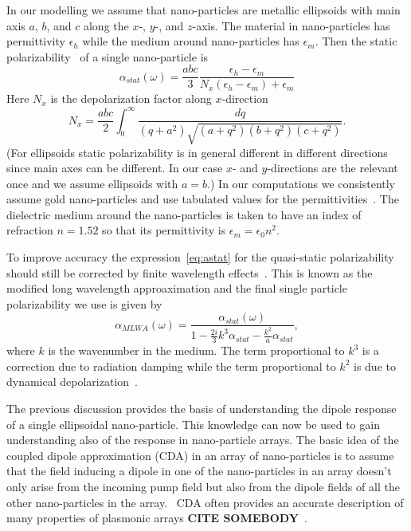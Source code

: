 \documentclass{iopart}
\newcommand{\beq}{\begin{equation}}
\newcommand{\enq}{\end{equation}}
\begin{document}
In our modelling we assume that nano-particles are metallic ellipsoids
with main axis $a$, $b$, and $c$ along the $x$-, $y$-, and $z$-axis.
The material in nano-particles has permittivity $\epsilon_h$ while
the medium around nano-particles has $\epsilon_m$. 
Then the static polarizability~\cite{meier_enhanced_1983} of a single nano-particle is
\beq
\alpha_{stat}(\omega)=\frac{abc}{3}\frac{\epsilon_h-\epsilon_m}{N_x(\epsilon_h-\epsilon_m)+\epsilon_m}
\label{eq:astat}
\enq
Here $N_x$ is the depolarization factor along $x$-direction
\beq
N_x=\frac{abc}{2}\int_0^\infty \frac{dq}{(q+a^2)\sqrt{(a+q^2)(b+q^2)(c+q^2)}}.
\enq
(For ellipsoids static polarizability is in general different in different directions since main axes can be different. In our case $x$- and $y$-directions are the relevant once and we assume ellipsoids with $a=b$.)
In our computations we consistently assume gold nano-particles
and use tabulated values for the permittivities~\cite{johnson_optical_1972}.
The dielectric medium around the nano-particles is taken to have an index of refraction 
$n=1.52$ so that its permittivity is $\epsilon_m=\epsilon_0 n^2$.

To improve accuracy the expression~\ref{eq:astat} for the quasi-static polarizability should still be corrected by finite wavelength effects~\cite{meier_enhanced_1983}. This is
known as the modified long wavelength approaximation and the final single
particle polarizability we use is given by
\beq
\alpha_{MLWA}(\omega)=\frac{\alpha_{stat}(\omega)}{1-\frac{2i}{3}k^3\alpha_{stat}-\frac{k^2}{a}\alpha_{stat}},
\enq
where $k$ is the wavenumber in the medium. The term proportional to
$k^3$ is a correction due to radiation damping while the term proportional to
$k^2$ is due to dynamical depolarization~\cite{kelly_optical_2003}.

The previous discussion provides the basis of understanding 
the dipole response of a single ellipsoidal nano-particle. This
knowledge can now be used to gain understanding also of the response in 
nano-particle arrays.
The basic idea of the coupled dipole approximation (CDA) 
in an array of nano-particles is to assume that the field inducing a dipole in one of the nano-particles
in an array doesn't only arise from the incoming pump field but also
from the dipole fields of all the other
nano-particles in the array.~\cite{purcell_scattering_1973,zhao_extinction_2003,yurkin_discrete_2007}
CDA often provides an accurate description of many properties of
plasmonic arrays {\bf CITE SOMEBODY}~\cite{vakevainen_plasmonic_2014}. 
\end{document}
